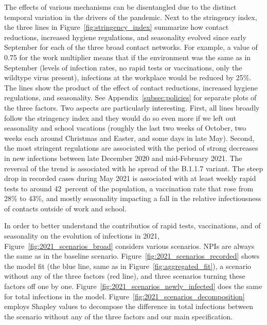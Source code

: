 The effects of various mechanisms can be disentangled due to the distinct temporal
variation in the drivers of the pandemic. Next to the stringency index, the three lines
in Figure~\ref{fig:stringency_index} summarize how contact reductions, increased hygiene
regulations, and seasonality evolved since early September for each of the three broad
contact networks. For example, a value of 0.75 for the work multiplier means that if the
environment was the same as in September (levels of infection rates, no rapid tests or
vaccinations, only the wildtype virus present), infections at the workplace would be
reduced by 25\%. The lines show the product of the effect of contact reductions,
increased hygiene regulations, and seasonality. See Appendix~\ref{subsec:policies} for
separate plots of the three factors. Two aspects are particularly interesting. First, all
lines broadly follow the stringency index and they would do so even more if we left out
seasonality and school vacations (roughly the last two weeks of October, two weeks each
around Christmas and Easter, and some days in late May). Second, the most stringent
regulations are associated with the period of strong decreases in new infections between
late December 2020 and mid-February 2021. The reversal of the trend is associated with he
spread of the B.1.1.7 variant. The steep drop in recorded cases during May 2021 is
associated with at least weekly rapid tests to around 42~percent of the population, a
vaccination rate that rose from 28\% to 43\%, and mostly seasonality impacting a fall in
the relative infectiousness of contacts outside of work and school.

In order to better understand the contributios  of rapid tests, vaccinations, and of
seasonality on the evolution of infections in 2021,
Figure~\ref{fig:2021_scenarios_broad} considers various scenarios. NPIs are always the
same as in the baseline scenario. Figure~\ref{fig:2021_scenarios_recorded} shows the
model fit (the blue line, same as in Figure~\ref{fig:aggregated_fit}), a scenario
without any of the three factors (red line), and three scenarios turning these factors
off one by one. Figure~\ref{fig:2021_scenarios_newly_infected} does the same for total
infections in the model. Figure~\ref{fig:2021_scenarios_decomposition} employs Shapley
values to decompose the difference in total infections between the scenario without any
of the three factors and our main specification.

